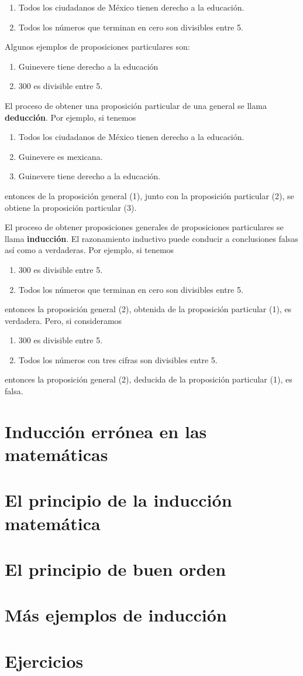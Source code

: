 \begin{enumerate}
    \item Todos los ciudadanos de México tienen derecho a la educación.
    \item Todos los números que terminan en cero son divisibles entre 5.
\end{enumerate}
Algunos ejemplos de proposiciones particulares son:
\begin{enumerate}
    \item Guinevere tiene derecho a la educación 
    \item 300 es divisible entre 5.
\end{enumerate}
El proceso de obtener una proposición particular de una general se llama \textbf{deducción}. Por ejemplo, si tenemos
\begin{enumerate}
    \item Todos los ciudadanos de México tienen derecho a la educación.
    \item Guinevere es mexicana.
    \item Guinevere tiene derecho a la educación.
\end{enumerate}
entonces de la proposición general (1), junto con la proposición particular (2), se obtiene la proposición particular (3).

El proceso de obtener proposiciones generales de proposiciones particulares se llama \textbf{inducción}. El razonamiento inductivo puede conducir a conclusiones falsas así como a verdaderas. Por ejemplo, si tenemos
\begin{enumerate}
    \item 300 es divisible entre 5.
    \item Todos los números que terminan en cero son divisibles entre 5.
\end{enumerate}
entonces la proposición general (2), obtenida de la proposición particular (1), es verdadera. Pero, si consideramos
\begin{enumerate}
    \item 300 es divisible entre 5.
    \item Todos los números con tres cifras son divisibles entre 5.
\end{enumerate}
entonces la proposición general (2), deducida de la proposición particular (1), es falsa.

\section{Inducción errónea en las matemáticas}

\section{El principio de la inducción matemática}

\section{El principio de buen orden}

\section{Más ejemplos de inducción}

\section{Ejercicios}